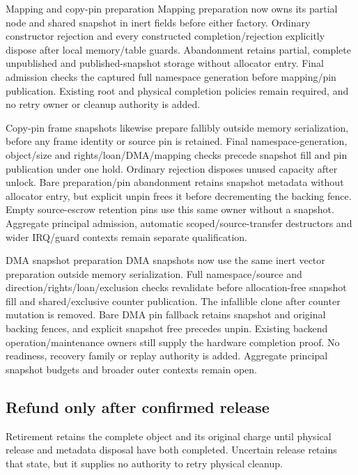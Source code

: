 \begin{implementationdetail}{Mapping and copy-pin preparation}
Mapping preparation now owns its partial node and shared snapshot in inert
fields before either factory. Ordinary constructor rejection and every
constructed completion/rejection explicitly dispose after local memory/table
guards. Abandonment retains partial, complete unpublished and published-snapshot
storage without allocator entry. Final admission checks the captured full
namespace generation before mapping/pin publication. Existing root and physical
completion policies remain required, and no retry owner or cleanup authority is added.

Copy-pin frame snapshots likewise prepare fallibly outside memory serialization,
before any frame identity or source pin is retained. Final namespace-generation,
object/size and rights/loan/DMA/mapping checks precede snapshot fill and pin
publication under one hold. Ordinary rejection disposes unused capacity after
unlock. Bare preparation/pin abandonment retains snapshot metadata without
allocator entry, but explicit unpin frees it before decrementing the backing fence.
Empty source-escrow retention pins use this same owner without a snapshot.
Aggregate principal admission, automatic scoped/source-transfer destructors and
wider IRQ/guard contexts remain separate qualification.
\end{implementationdetail}

\begin{implementationdetail}{DMA snapshot preparation}
DMA snapshots now use the same inert vector preparation outside memory
serialization. Full namespace/source and direction/rights/loan/exclusion checks
revalidate before allocation-free snapshot fill and shared/exclusive counter
publication. The infallible clone after counter mutation is removed. Bare DMA
pin fallback retains snapshot and original backing fences, and explicit snapshot
free precedes unpin. Existing backend operation/maintenance owners still supply
the hardware completion proof. No readiness, recovery family or replay authority
is added. Aggregate principal snapshot budgets and broader outer contexts remain open.
\end{implementationdetail}

\subsection{Refund only after confirmed release}

Retirement retains the complete object and its original charge until physical
release and metadata disposal have both completed. Uncertain release retains
that state, but it supplies no authority to retry physical cleanup.

